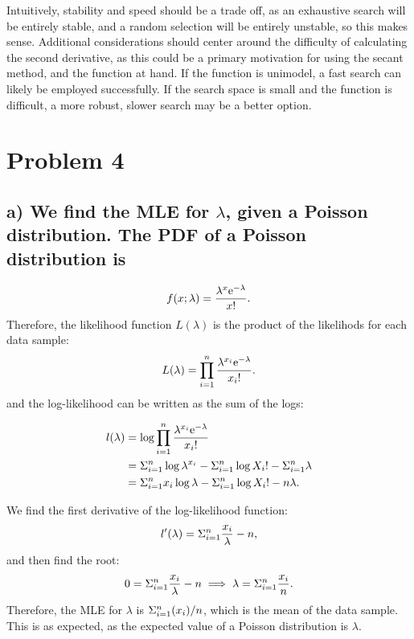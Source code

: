 \documentclass[]{article}
\begin{document}
Intuitively, stability and speed should be a trade off, as an exhaustive
search will be entirely stable, and a random selection will be entirely
unstable, so this makes sense. Additional considerations should center
around the difficulty of calculating the second derivative, as this
could be a primary motivation for using the secant method, and the
function at hand. If the function is unimodel, a fast search can likely
be employed successfully. If the search space is small and the function
is difficult, a more robust, slower search may be a better option.

\section{Problem 4}\label{problem-4}

\subsection{\texorpdfstring{a) We find the MLE for \(\lambda\), given a
Poisson distribution. The PDF of a Poisson distribution
is}{a) We find the MLE for \textbackslash{}lambda, given a Poisson distribution. The PDF of a Poisson distribution is}}\label{a-we-find-the-mle-for-lambda-given-a-poisson-distribution.-the-pdf-of-a-poisson-distribution-is}

\[
f(x; \lambda) = \frac{\lambda^{x}\rm{e}^{-\lambda}}{x!}.
\] Therefore, the likelihood function \(L(\lambda)\) is the product of
the likelihods for each data sample: \[
  L(\lambda) = \prod_{i=1}^{n} \frac{\lambda^{x_i}\rm{e}^{-\lambda}}{x_i!}.
\] and the log-likelihood can be written as the sum of the logs:

\begin{align*}
l(\lambda) &=  \log{\prod_{i=1}^{n} \frac{\lambda^{x_i}\rm{e}^{-\lambda}}{x_i!}} \\
          &= \Sigma_{i=1}^{n} \log{\lambda^{x_i}} - \Sigma_{i=1}^{n} \log{X_i!} - \Sigma_{i=1}^{n} \lambda \\
          &=  \Sigma_{i=1}^{n} x_i \log{\lambda} - \Sigma_{i=1}^{n} \log{X_i!} - n \lambda.
\end{align*}

We find the first derivative of the log-likelihood function: \[
l^{\prime}(\lambda) = \Sigma_{i=1}^{n} \frac{x_i}{\lambda} - n,
\] and then find the root: \[
 0 = \Sigma_{i=1}^{n} \frac{x_i}{\lambda} - n \implies \lambda = \Sigma_{i=1}^{n} \frac{x_i}{n}.
 \] Therefore, the MLE for \(\lambda\) is \(\Sigma_{i=1}^{n}(x_i) / n\), which is
the mean of the data sample. This is as expected, as the expected value
of a Poisson distribution is \(\lambda\).
\end{document}
